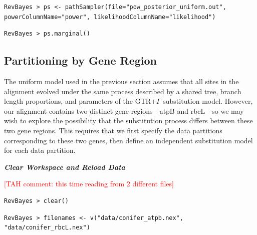 \documentclass[11pt]{article}
\newcommand{\taha}[1]{{\textcolor{red}{[TAH comment: #1]}}} %
\begin{document}
{\tt \small \begin{snugshade*}
\begin{lstlisting}
RevBayes > ps <- pathSampler(file="pow_posterior_uniform.out", powerColumnName="power", likelihoodColumnName="likelihood")
\end{lstlisting}
\end{snugshade*}}

{\tt \begin{snugshade*}
\begin{lstlisting}
RevBayes > ps.marginal() 
\end{lstlisting}
\end{snugshade*}}








\bigskip
\subsection{Partitioning by Gene Region}\label{secByGene}

The uniform model used in the previous section assumes that all sites in the alignment evolved under the same process described by a shared tree, branch length proportions, and parameters of the GTR+$\Gamma$ substitution model.
However, our alignment contains two distinct gene regions---atpB and rbcL---so we may wish to explore the possibility that the substitution process differs between these two gene regions.
This requires that we first specify the data partitions corresponding to these two genes, then define an independent substitution model for each data partition. 

\textbf{\textit{Clear Workspace and Reload Data}}

\taha{this time reading from 2 different files}

{\tt \begin{snugshade*}
\begin{lstlisting}
RevBayes > clear()
\end{lstlisting}
\end{snugshade*}}

{\tt \begin{snugshade*}
\begin{lstlisting}
RevBayes > filenames <- v("data/conifer_atpb.nex", "data/conifer_rbcL.nex")
\end{lstlisting}
\end{snugshade*}}
\end{document}
